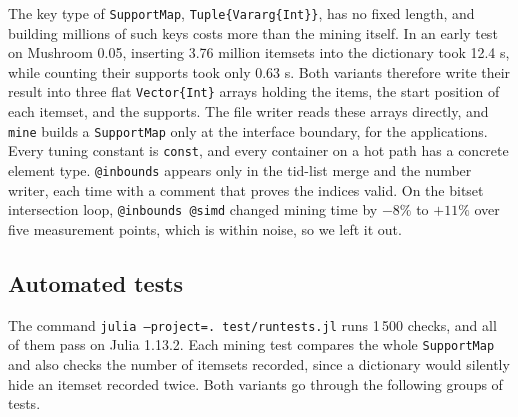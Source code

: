 The key type of \texttt{SupportMap}, \texttt{Tuple\{Vararg\{Int\}\}}, has no fixed length,
and building millions of such keys costs more than the mining itself. In an early test on
Mushroom 0.05, inserting 3.76 million itemsets into the dictionary took 12.4 s, while
counting their supports took only 0.63 s. Both variants therefore write their result into
three flat \texttt{Vector\{Int\}} arrays holding the items, the start position of each
itemset, and the supports. The file writer reads these arrays directly, and \texttt{mine}
builds a \texttt{SupportMap} only at the interface boundary, for the applications. Every
tuning constant is \texttt{const}, and every container on a hot path has a concrete
element type. \texttt{@inbounds} appears only in the tid-list merge and the number writer,
each time with a comment that proves the indices valid. On the bitset intersection loop,
\texttt{@inbounds @simd} changed mining time by $-8\%$ to $+11\%$ over five measurement
points, which is within noise, so we left it out.

\subsection{Automated tests}
\label{sec:tests}
The command \texttt{julia --project=. test/runtests.jl} runs 1\,500 checks, and all of
them pass on Julia 1.13.2. Each mining test compares the whole \texttt{SupportMap} and
also checks the number of itemsets recorded, since a dictionary would silently hide an
itemset recorded twice. Both variants go through the following groups of tests.

